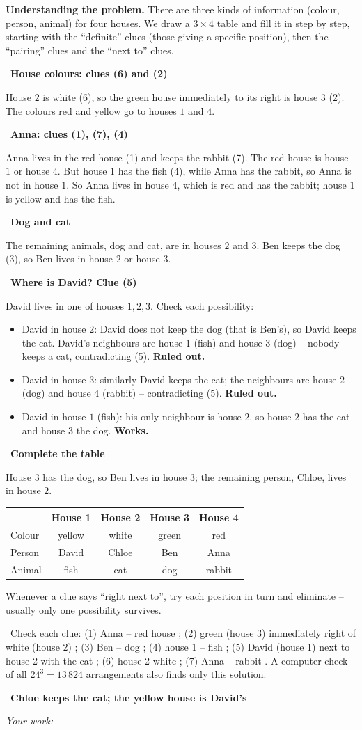 \documentclass[11pt]{article}
\newif\ifsol \solfalse
\providecommand{\AnsWord}{Đáp số}
\newcommand{\StuProb}[2]{\begin{probboxS}{#1}{#2}\StuProbBody\end{probboxS}}
\newcommand{\ans}[1]{\par\smallskip{\bfseries\color{tmGreen!88!black}\AnsWord:}\ {\bfseries\color{AnsRed}#1}\par}
\newcommand{\probsol}[1]{%
  \begin{lrbox}{\solmeasure}\begin{minipage}{\dimexpr\linewidth-24pt\relax}#1\end{minipage}\end{lrbox}%
  \ifsol
    \begin{solbox}#1\end{solbox}%
  \else
    \setlength{\solht}{\dimexpr\ht\solmeasure+\dp\solmeasure+0.85cm\relax}%
    \ifdim\solht<1.35cm\setlength{\solht}{1.35cm}\fi
    \ifdim\solht>\StudentMaxWork\setlength{\solht}{\StudentMaxWork}\fi
    \par\noindent\begin{minipage}{\linewidth}%
    \expandafter\StuProb\StuProbArgs
    \begin{tcolorbox}[colback=white,colframe=Line,boxrule=0.8pt,arc=5pt,
      left=8pt,right=8pt,top=4pt,bottom=4pt,height=\solht]{\footnotesize\color{Slate}\itshape\WorkWord}\end{tcolorbox}%
    \end{minipage}\par\medskip
  \fi}
\newlength{\StudentMaxWork}\setlength{\StudentMaxWork}{4.5cm}
\newcommand{\step}[2]{\par\smallskip\noindent{\bfseries\color{tmBlue!85!black}\StepWord~#1.}\ {\bfseries #2}\par\nopagebreak}
\newcommand{\verify}[1]{\par\smallskip\noindent{\bfseries\color{tmGreen!80!black}\faCheckCircle\ \CheckWord}\ #1\par}
\def\WorkWord{Your work:}
\def\AnsWord{Answer}
\def\StepWord{Step}
\def\CheckWord{Check:}
\begin{document}
\probsol{
\textbf{Understanding the problem.} There are three kinds of information (colour, person, animal) for four houses. We draw a $3\times 4$
table and fill it in step by step, starting with the ``definite'' clues (those giving a specific position), then the ``pairing'' clues
and the ``next to'' clues.
\step{1}{House colours: clues (6) and (2)}
House $2$ is white (6), so the green house immediately to its right is house $3$ (2). The colours red and yellow go to houses $1$ and
$4$.
\step{2}{Anna: clues (1), (7), (4)}
Anna lives in the red house (1) and keeps the rabbit (7). The red house is house $1$ or house $4$. But house $1$ has the fish (4), while Anna
has the rabbit, so Anna is not in house $1$. So Anna lives in house $4$, which is red and has the rabbit; house $1$ is yellow and has the
fish.
\step{3}{Dog and cat}
The remaining animals, dog and cat, are in houses $2$ and $3$. Ben keeps the dog (3), so Ben lives in house $2$ or house $3$.
\step{4}{Where is David? Clue (5)}
David lives in one of houses $1, 2, 3$. Check each possibility:
\begin{itemize}[leftmargin=1.4em,itemsep=0pt,topsep=1pt]
  \item David in house $2$: David does not keep the dog (that is Ben's), so David keeps the cat. David's neighbours are house $1$ (fish)
  and house $3$ (dog) -- nobody keeps a cat, contradicting (5). \textbf{Ruled out.}
  \item David in house $3$: similarly David keeps the cat; the neighbours are house $2$ (dog) and house $4$ (rabbit) -- contradicting (5).
  \textbf{Ruled out.}
  \item David in house $1$ (fish): his only neighbour is house $2$, so house $2$ has the cat and house $3$ the dog. \textbf{Works.}
\end{itemize}
\step{5}{Complete the table}
House $3$ has the dog, so Ben lives in house $3$; the remaining person, Chloe, lives in house $2$.
\begin{center}\small
\begin{tabular}{|l|c|c|c|c|}
\hline
\rowcolor{tmBlue!10} & House 1 & House 2 & House 3 & House 4\\ \hline
Colour & yellow & white & green & red\\ \hline
Person & David & Chloe & Ben & Anna\\ \hline
Animal & fish & cat & dog & rabbit\\ \hline
\end{tabular}
\end{center}
\begin{tipbox}Whenever a clue says ``right next to'', try each position in turn and eliminate -- usually only one possibility survives.
\end{tipbox}
\verify{Check each clue: (1) Anna -- red house \checkmark; (2) green (house 3) immediately right of white (house 2) \checkmark; (3) Ben --
dog \checkmark; (4) house 1 -- fish \checkmark; (5) David (house 1) next to house 2 with the cat \checkmark; (6) house 2 white
\checkmark; (7) Anna -- rabbit \checkmark. A computer check of all $24^3 = 13\,824$ arrangements also finds only this solution.}
\ans{Chloe keeps the cat; the yellow house is David's}
}
\end{document}
